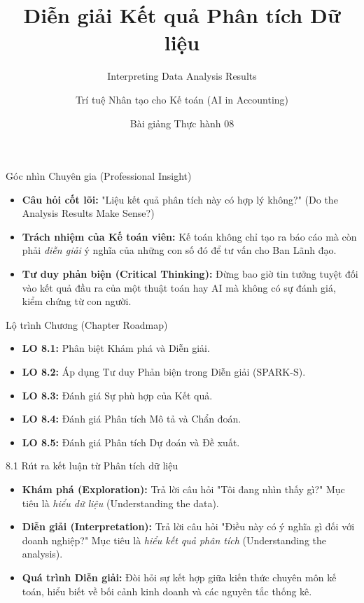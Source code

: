 \documentclass[aspectratio=169,12pt]{beamer}
\title[Thực hành - Chương 08]{Diễn giải Kết quả Phân tích Dữ liệu}
\subtitle{Interpreting Data Analysis Results}
\author[Giảng viên]{Trí tuệ Nhân tạo cho Kế toán (AI in Accounting)}
\institute[Đại học]{Khoa Kế toán - Kiểm toán}
\date{Bài giảng Thực hành 08}
\begin{document}
\begin{frame}
    \titlepage
\end{frame}

\begin{frame}{Góc nhìn Chuyên gia (Professional Insight)}
\begin{itemize}
    \item \textbf{Câu hỏi cốt lõi:} "Liệu kết quả phân tích này có hợp lý không?" (Do the Analysis Results Make Sense?)
    \item \textbf{Trách nhiệm của Kế toán viên:} Kế toán không chỉ tạo ra báo cáo mà còn phải \textit{diễn giải} ý nghĩa của những con số đó để tư vấn cho Ban Lãnh đạo.
    \item \textbf{Tư duy phản biện (Critical Thinking):} Đừng bao giờ tin tưởng tuyệt đối vào kết quả đầu ra của một thuật toán hay AI mà không có sự đánh giá, kiểm chứng từ con người.
\end{itemize}
\end{frame}

\begin{frame}{Lộ trình Chương (Chapter Roadmap)}
\begin{itemize}
    \item \textbf{LO 8.1:} Phân biệt Khám phá và Diễn giải.
    \item \textbf{LO 8.2:} Áp dụng Tư duy Phản biện trong Diễn giải (SPARK-S).
    \item \textbf{LO 8.3:} Đánh giá Sự phù hợp của Kết quả.
    \item \textbf{LO 8.4:} Đánh giá Phân tích Mô tả và Chẩn đoán.
    \item \textbf{LO 8.5:} Đánh giá Phân tích Dự đoán và Đề xuất.
\end{itemize}
\end{frame}

\begin{frame}{8.1 Rút ra kết luận từ Phân tích dữ liệu}
\begin{itemize}
    \item \textbf{Khám phá (Exploration):} Trả lời câu hỏi "Tôi đang nhìn thấy gì?" Mục tiêu là \textit{hiểu dữ liệu} (Understanding the data).
    \item \textbf{Diễn giải (Interpretation):} Trả lời câu hỏi "Điều này có ý nghĩa gì đối với doanh nghiệp?" Mục tiêu là \textit{hiểu kết quả phân tích} (Understanding the analysis).
    \item \textbf{Quá trình Diễn giải:} Đòi hỏi sự kết hợp giữa kiến thức chuyên môn kế toán, hiểu biết về bối cảnh kinh doanh và các nguyên tắc thống kê.
\end{itemize}
\end{frame}
\end{document}
